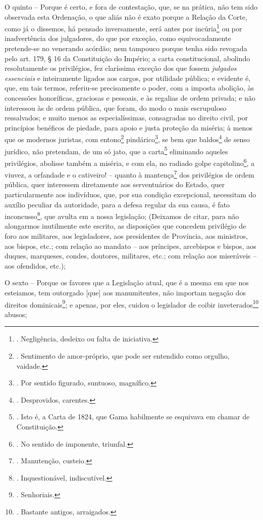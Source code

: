 O quinto -- Porque é certo, e fora de contestação, que, se na prática,
não tem sido observada esta Ordenação, o que aliás não é exato porque a
Relação da Corte, como já o dissemos, há pensado inversamente, será
antes por incúria\footnote{. Negligência, desleixo ou falta de
  iniciativa.} ou por inadvertência dos julgadores, do que por exceção,
como equivocadamente pretende-se no venerando acórdão; nem tampouco
porque tenha sido revogada pelo art. 179, § 16 da Constituição do
Império; a carta constitucional, abolindo resolutamente os privilégios,
fez claríssima exceção dos que fossem \emph{julgados essenciais} e
inteiramente ligados aos cargos, por utilidade pública; e evidente é,
que, em tais termos, referiu-se precisamente o poder, com a imposta
abolição, às concessões honoríficas, graciosas e pessoais, e às regalias
de ordem privada; e não interessou às de ordem pública, que foram, do
modo o mais escrupuloso ressalvados; e muito menos as especialíssimas,
consagradas no direito civil, por princípios benéficos de piedade, para
apoio e justa proteção da miséria; à menos que os modernos juristas, com
entono\footnote{. Sentimento de amor-próprio, que pode ser entendido
  como orgulho, vaidade.} pindárico\footnote{. Por sentido figurado,
  suntuoso, magnífico.}, se bem que baldos\footnote{. Desprovidos,
  carentes.} de senso jurídico, não pretendam, de um só jato, que a
carta\footnote{. Isto é, a Carta de 1824, que Gama habilmente se
  esquivava em chamar de Constituição.} eliminando aqueles privilégios,
abolisse também a miséria, e com ela, no radiado golpe
capitolino\footnote{. No sentido de imponente, triunfal.}, a viuvez, a
orfandade e o cativeiro! -- quanto à mantença\footnote{. Manutenção,
  custeio.} dos privilégios de ordem pública, quer interessem
diretamente aos serventuários do Estado, quer particularmente aos
indivíduos, que, por sua condição excepcional, necessitam do auxílio
peculiar da autoridade, para a defesa regular da sua causa, é fato
inconcusso\footnote{. Inquestionável, indiscutível.}, que avulta em a
nossa legislação; (Deixamos de citar, para não alongarmos inutilmente
este escrito, as disposições que concedem privilégio de foro aos
militares, aos legisladores, aos presidentes de Província, aos
ministros, aos bispos, etc.; com relação ao mandato -- aos príncipes,
arcebispos e bispos, aos duques, marqueses, condes, doutores, militares,
etc.; com relação aos miseráveis -- aos ofendidos, etc.);

O sexto -- Porque os favores que a Legislação atual, que é a mesma em
que nos esteiamos, tem outorgado {[}que{]} aos manumitentes, não
importam negação dos direitos dominicais\footnote{. Senhoriais.}; e
apenas, por eles, cuidou o legislador de coibir inveterados\footnote{.
  Bastante antigos, arraigados.} abusos;

